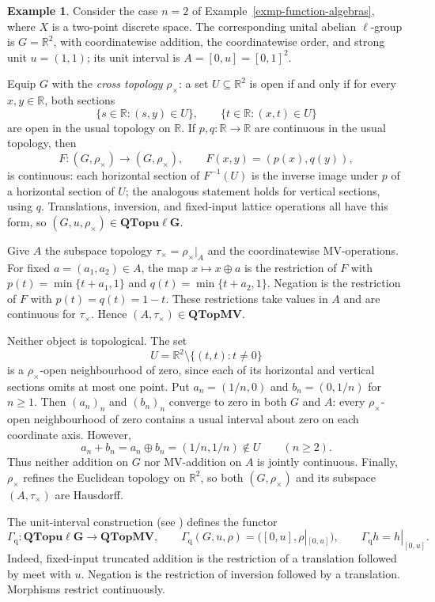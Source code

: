 \documentclass[preprint,3p]{elsarticle}
\theoremstyle{plain}
\theoremstyle{definition}
\newtheorem{exmp}[thm]{Example}
\newcommand{\QTopMV}{\mathbf{QTopMV}}
\newcommand{\QTopulg}{\mathbf{QTopu\ell G}}
\numberwithin{equation}{section}
\begin{document}
\begin{exmp}
\label{exmp-cross-quasitopological}
Consider the case $n=2$ of Example~\ref{exmp-function-algebras},
where $X$ is a two-point discrete space.  The corresponding unital
abelian $\ell$-group is $G=\mathbb R^2$, with coordinatewise addition,
the coordinatewise order, and strong unit $u=(1,1)$; its unit interval is
$A=[0,u]=[0,1]^2$.

Equip $G$ with the \emph{cross topology} $\rho_\times$: a set
$U\subseteq\mathbb R^2$ is open if and only if for every
$x,y\in\mathbb R$, both sections
\[
 \{s\in\mathbb R:(s,y)\in U\},
 \qquad
 \{t\in\mathbb R:(x,t)\in U\}
\]
are open in the usual topology on $\mathbb R$.
If $p,q\colon\mathbb R\longrightarrow\mathbb R$ are continuous
in the usual topology, then
\[
 F\colon(G,\rho_\times)\longrightarrow(G,\rho_\times),
 \qquad F(x,y)=(p(x),q(y)),
\]
is continuous: each horizontal section of $F^{-1}(U)$ is the
inverse image under $p$ of a horizontal section of $U$;
the analogous statement holds for vertical sections, using $q$.
Translations, inversion, and fixed-input lattice operations all
have this form, so $(G,u,\rho_\times)\in\QTopulg$.

Give $A$ the subspace topology $\tau_\times=\rho_\times|_A$ and
the coordinatewise MV-operations.  For fixed $a=(a_1,a_2)\in A$,
the map $x\mapsto x\oplus a$ is the restriction of $F$ with
$p(t)=\min\{t+a_1,1\}$ and $q(t)=\min\{t+a_2,1\}$.
Negation is the restriction of $F$ with $p(t)=q(t)=1-t$.
These restrictions take values in $A$ and are continuous for
$\tau_\times$.  Hence $(A,\tau_\times)\in\QTopMV$.

Neither object is topological.  The set
\[
 U=\mathbb R^2\setminus\{(t,t):t\neq0\}
\]
is a $\rho_\times$-open neighbourhood of zero, since each of its
horizontal and vertical sections omits at most one point.
Put $a_n=(1/n,0)$ and $b_n=(0,1/n)$ for $n\geq1$.
Then $(a_n)_n$ and $(b_n)_n$ converge to zero in both $G$ and $A$:
every $\rho_\times$-open neighbourhood of zero
contains a usual interval about zero on each coordinate axis.
However,
\[
 a_n+b_n=a_n\oplus b_n=(1/n,1/n)\notin U
 \qquad(n\geq2).
\]
Thus neither addition on $G$ nor MV-addition on $A$ is jointly
continuous.  Finally,
$\rho_\times$ refines the Euclidean topology on $\mathbb R^2$,
so both $(G,\rho_\times)$ and its subspace $(A,\tau_\times)$
are Hausdorff.
\end{exmp}

The unit-interval construction
(see \cite[Theorem~4.9]{Zahiri2014}) defines the functor
\begin{equation}
\label{eq-Gammaq-definition}
 \Gamma_{\mathrm q}\colon\QTopulg\longrightarrow\QTopMV,
 \qquad
 \Gamma_{\mathrm q}(G,u,\rho)=([0,u],\rho|_{[0,u]}),
 \qquad
 \Gamma_{\mathrm q}h=h|_{[0,u]}.
\end{equation}
Indeed, fixed-input truncated addition is the restriction of a
translation followed by meet with $u$.  Negation is the restriction
of inversion followed by a translation.
Morphisms restrict continuously.
\end{document}
